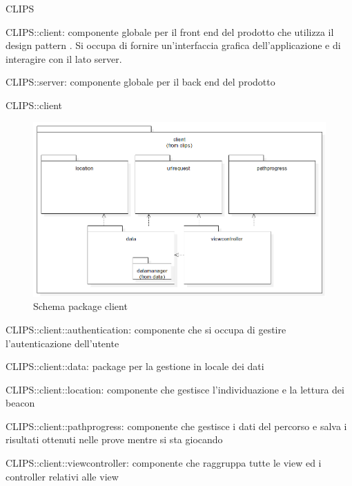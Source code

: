 \begin{componente}{CLIPS}
\begin{compPackageContenuti}
\item CLIPS::client: componente globale per il front end del prodotto che utilizza il design pattern . Si occupa di fornire un'interfaccia grafica dell'applicazione e di interagire con il lato server.
\item CLIPS::server: componente globale per il back end del prodotto
\end{compPackageContenuti}
\end{componente}
\begin{componente}{CLIPS::client}
\begin{figure}[h!]
\centering
\includegraphics[scale=0.4]{img/package/png/client.png}
\caption{Schema package client}
 \end{figure}
\begin{compPackageContenuti}
\item CLIPS::client::authentication: componente che si occupa di gestire l'autenticazione dell'utente
\item CLIPS::client::data: package per la gestione in locale dei dati
\item CLIPS::client::location: componente che gestisce l'individuazione e la lettura dei beacon
\item CLIPS::client::pathprogress: componente che gestisce i dati del percorso e salva i risultati ottenuti nelle prove mentre si sta giocando
\item CLIPS::client::viewcontroller: componente che raggruppa tutte le view ed i controller relativi alle view
\end{compPackageContenuti}
\end{componente}
